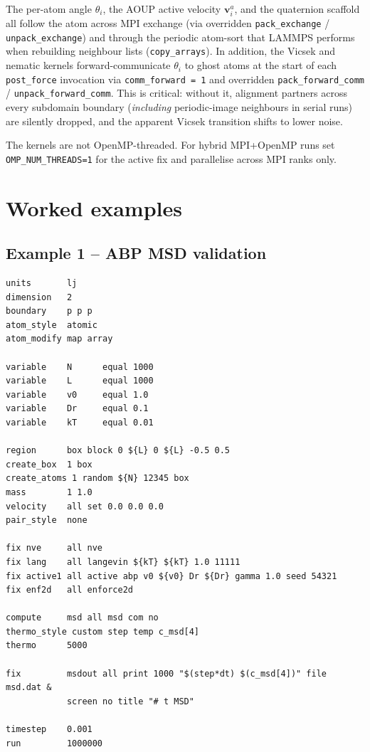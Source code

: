 \documentclass[11pt,a4paper]{article}
\begin{document}
The per-atom angle $\theta_i$, the AOUP active velocity $\mathbf v_i^{a}$,
and the quaternion scaffold all follow the atom across MPI exchange (via
overridden \texttt{pack\_exchange} / \texttt{unpack\_exchange}) and through
the periodic atom-sort that LAMMPS performs when rebuilding neighbour
lists (\texttt{copy\_arrays}).  In addition, the Vicsek and nematic
kernels forward-communicate $\theta_i$ to ghost atoms at the start of each
\texttt{post\_force} invocation via \texttt{comm\_forward = 1} and
overridden \texttt{pack\_forward\_comm} / \texttt{unpack\_forward\_comm}.
This is critical: without it, alignment partners across every subdomain
boundary (\emph{including} periodic-image neighbours in serial runs)
are silently dropped, and the apparent Vicsek transition shifts to lower
noise.

The kernels are not OpenMP-threaded.  For hybrid MPI+OpenMP runs set
\texttt{OMP\_NUM\_THREADS=1} for the active fix and parallelise across MPI
ranks only.

\section{Worked examples}

\subsection{Example 1 -- ABP MSD validation}

\begin{lstlisting}
units       lj
dimension   2
boundary    p p p
atom_style  atomic
atom_modify map array

variable    N      equal 1000
variable    L      equal 1000
variable    v0     equal 1.0
variable    Dr     equal 0.1
variable    kT     equal 0.01

region      box block 0 ${L} 0 ${L} -0.5 0.5
create_box  1 box
create_atoms 1 random ${N} 12345 box
mass        1 1.0
velocity    all set 0.0 0.0 0.0
pair_style  none

fix nve     all nve
fix lang    all langevin ${kT} ${kT} 1.0 11111
fix active1 all active abp v0 ${v0} Dr ${Dr} gamma 1.0 seed 54321
fix enf2d   all enforce2d

compute     msd all msd com no
thermo_style custom step temp c_msd[4]
thermo      5000

fix         msdout all print 1000 "$(step*dt) $(c_msd[4])" file msd.dat &
            screen no title "# t MSD"

timestep    0.001
run         1000000
\end{lstlisting}
\end{document}
